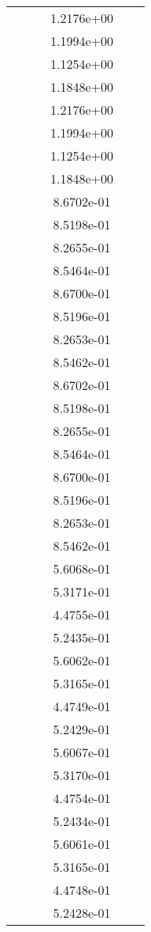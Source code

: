 \begin{xltabular}{\textwidth}{r|rS[table-format=1.3e+2]S[table-format=1.4e+2]S[table-format=1.4e+2]S[table-format=-1.5]}
&  &  & 1.2176e+00 & & \\
&  &  & 1.1994e+00 & & \\
&  &  & 1.1254e+00 & & \\
&  &  & 1.1848e+00 & & \\
&  &  & 1.2176e+00 & & \\
&  &  & 1.1994e+00 & & \\
&  &  & 1.1254e+00 & & \\
&  &  & 1.1848e+00 & & \\
&  &  & 8.6702e-01 & & \\
&  &  & 8.5198e-01 & & \\
&  &  & 8.2655e-01 & & \\
&  &  & 8.5464e-01 & & \\
&  &  & 8.6700e-01 & & \\
&  &  & 8.5196e-01 & & \\
&  &  & 8.2653e-01 & & \\
&  &  & 8.5462e-01 & & \\
&  &  & 8.6702e-01 & & \\
&  &  & 8.5198e-01 & & \\
&  &  & 8.2655e-01 & & \\
&  &  & 8.5464e-01 & & \\
&  &  & 8.6700e-01 & & \\
&  &  & 8.5196e-01 & & \\
&  &  & 8.2653e-01 & & \\
&  &  & 8.5462e-01 & & \\
&  &  & 5.6068e-01 & & \\
&  &  & 5.3171e-01 & & \\
&  &  & 4.4755e-01 & & \\
&  &  & 5.2435e-01 & & \\
&  &  & 5.6062e-01 & & \\
&  &  & 5.3165e-01 & & \\
&  &  & 4.4749e-01 & & \\
&  &  & 5.2429e-01 & & \\
&  &  & 5.6067e-01 & & \\
&  &  & 5.3170e-01 & & \\
&  &  & 4.4754e-01 & & \\
&  &  & 5.2434e-01 & & \\
&  &  & 5.6061e-01 & & \\
&  &  & 5.3165e-01 & & \\
&  &  & 4.4748e-01 & & \\
&  &  & 5.2428e-01 & & \\

\end{xltabular}
